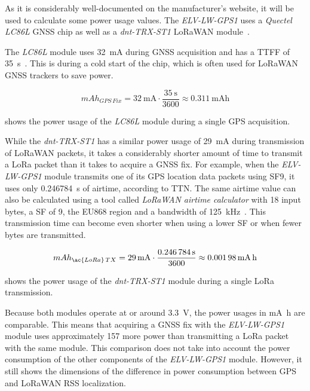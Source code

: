 As it is considerably well-documented on the manufacturer's website, it will be used to calculate some power usage values.
The \emph{ELV-LW-GPS1} uses a \emph{Quectel LC86L} \ac{GNSS} chip as well as a \emph{dnt-TRX-ST1} \ac{LoRaWAN} module~\cite{elv_elektronik_ag_elv_2023}.

The \emph{LC86L} module uses \SI{32}{\milli\ampere} during \ac{GNSS} acquisition and has a \ac{TTFF} of \SI{35}{\second}~\cite{quectel_gnss_nodate}.
This is during a cold start of the chip, which is often used for \ac{LoRaWAN} \ac{GNSS} trackers to save power.

\begin{equation}\label{eq:LC86L-fix-consumption}
    mAh_{GPS\,Fix} = \SI{32}{\milli\ampere} \cdot \frac{\SI{35}{\second}}{3600} \approx \SI{0.311}{\milli\ampere\hour}
\end{equation}

 shows the power usage of the \emph{LC86L} module during a single \ac{GPS} acquisition.

While the \emph{dnt-TRX-ST1} has a similar power usage of \SI{29}{\milli\ampere} during transmission of \ac{LoRaWAN} packets, it takes a considerably shorter amount of time to transmit a \ac{LoRa} packet than it takes to acquire a \ac{GNSS} fix.
For example, when the \emph{ELV-LW-GPS1} module transmits one of its \ac{GPS} location data packets using \ac{SF}9, it uses only \SI{0.246784}{\second} of airtime, according to \ac{TTN}.
The same airtime value can also be calculated using a tool called \emph{\ac{LoRaWAN} airtime calculator} with 18 input bytes, a \ac{SF} of 9, the EU868 region and a bandwidth of \SI{125}{\kilo\hertz}~\cite{the_things_network_lorawan_nodate}.
This transmission time can become even shorter when using a lower \ac{SF} or when fewer bytes are transmitted.

\begin{equation}\label{eq:dnt-TRX-ST1-tx-consumption}
    mAh_{\ac{LoRa}\,TX} = \SI{29}{\milli\ampere} \cdot \frac{\SI{0.246784}{\second}}{3600} \approx \SI{0.00198}{\milli\ampere\hour}
\end{equation}

 shows the power usage of the \emph{dnt-TRX-ST1} module during a single \ac{LoRa} transmission.

Because both modules operate at or around \SI{3.3}{\volt}, the power usages in \si{\milli\ampere\hour} are comparable.
This means that acquiring a \ac{GNSS} fix with the \emph{ELV-LW-GPS1} module uses approximately \SI{157}{\times} more power than transmitting a \ac{LoRa} packet with the same module.
This comparison does not take into account the power consumption of the other components of the \emph{ELV-LW-GPS1} module.
However, it still shows the dimensions of the difference in power consumption between \ac{GPS} and \ac{LoRaWAN} \ac{RSS} localization.

